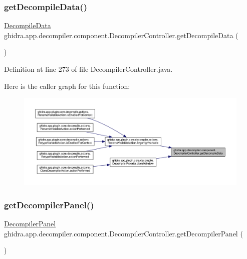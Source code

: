 \subsubsection{\texorpdfstring{getDecompileData()}{getDecompileData()}}
{\footnotesize\ttfamily \mbox{\hyperlink{classghidra_1_1app_1_1decompiler_1_1component_1_1_decompile_data}{Decompile\+Data}} ghidra.\+app.\+decompiler.\+component.\+Decompiler\+Controller.\+get\+Decompile\+Data (\begin{DoxyParamCaption}{ }\end{DoxyParamCaption})\hspace{0.3cm}{\ttfamily [inline]}}



Definition at line 273 of file Decompiler\+Controller.\+java.

Here is the caller graph for this function\+:
\nopagebreak
\begin{figure}[H]
\begin{center}
\leavevmode
\includegraphics[width=350pt]{classghidra_1_1app_1_1decompiler_1_1component_1_1_decompiler_controller_a4ee0f6c3fe8b310fb71faefb1ee3ce99_icgraph}
\end{center}
\end{figure}
\mbox{\label{classghidra_1_1app_1_1decompiler_1_1component_1_1_decompiler_controller_aa8f29129756996d82bba639e741296bb}} 
\subsubsection{\texorpdfstring{getDecompilerPanel()}{getDecompilerPanel()}}
{\footnotesize\ttfamily \mbox{\hyperlink{classghidra_1_1app_1_1decompiler_1_1component_1_1_decompiler_panel}{Decompiler\+Panel}} ghidra.\+app.\+decompiler.\+component.\+Decompiler\+Controller.\+get\+Decompiler\+Panel (\begin{DoxyParamCaption}{ }\end{DoxyParamCaption})\hspace{0.3cm}{\ttfamily [inline]}}



